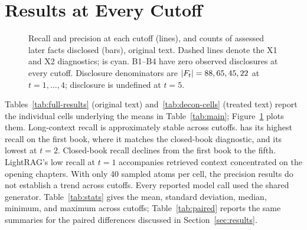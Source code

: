 \section{Results at Every Cutoff}
\label{app:full-results}






\begin{figure}[t]
\centering
\resizebox{\textwidth}{!}{}
\caption{Recall and precision at each cutoff (lines), and counts of assessed later facts
disclosed (bars), original text. Dashed lines denote the X1 and X2 diagnostics; \sys{} is cyan.
B1--B4 have zero observed disclosures at every cutoff. Disclosure denominators are $|F_t|=88,65,45,22$ at
$t=1,\ldots,4$; disclosure is undefined at $t=5$.}
\label{fig:cutoffplot}
\end{figure}

Tables~\ref{tab:full-results} (original text) and~\ref{tab:decon-cells} (treated text) report the individual cells underlying the means in
Table~\ref{tab:main}; Figure~\ref{fig:cutoffplot} plots them. Long-context recall is
approximately stable across cutoffs. \sys has its highest recall on the first book, where it
matches the closed-book diagnostic, and its lowest at $t=2$. Closed-book recall declines from
the first book to the fifth. LightRAG's low recall at $t=1$ accompanies retrieved context
concentrated on the opening chapters. With only 40 sampled atoms per cell, the precision
results do not establish a trend across cutoffs. Every reported model call used the shared
generator. Table~\ref{tab:stats} gives the mean, standard deviation, median, minimum, and
maximum across cutoffs; Table~\ref{tab:paired} reports the same summaries for the paired
differences discussed in Section~\ref{sec:results}.
